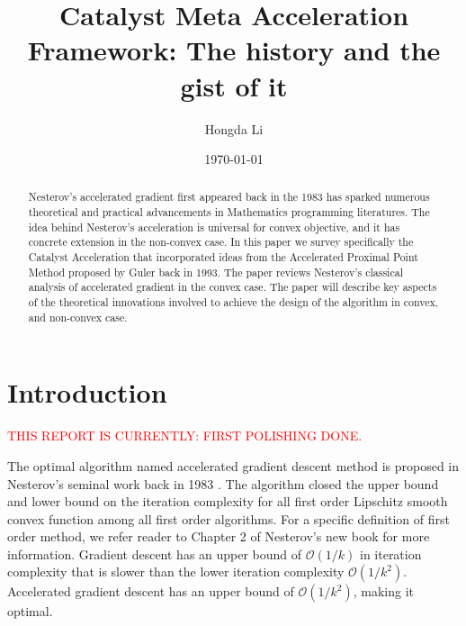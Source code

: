 \documentclass[12pt]{article}
\begin{document}
\title{
    {
        \selectfont 
        Catalyst Meta Acceleration Framework: The history and the gist of it
    }
    }

\author{
    Hongda Li
}

\date{\today}

\maketitle


\begin{abstract} 
    \noindent
    Nesterov's accelerated gradient first appeared back in the 1983 has sparked numerous theoretical and practical advancements in Mathematics programming literatures. 
    The idea behind Nesterov's acceleration is universal for convex objective, and it has concrete extension in the non-convex case. 
    In this paper we survey specifically the Catalyst Acceleration that incorporated ideas from the Accelerated Proximal Point Method proposed by Guler back in 1993. 
    The paper reviews Nesterov's classical analysis of accelerated gradient in the convex case.
    The paper will describe key aspects of the theoretical innovations involved to achieve the design of the algorithm in convex, and non-convex case. 
    
\end{abstract}


\section{Introduction}
    \textcolor{red}{THIS REPORT IS CURRENTLY: FIRST POLISHING DONE. }

    The optimal algorithm named accelerated gradient descent method is proposed in Nesterov's seminal work back in 1983 \cite{nesterov_method_1983}. 
    The algorithm closed the upper bound and lower bound on the iteration complexity for all first order Lipschitz smooth convex function among all first order algorithms. 
    For a specific definition of first order method, we refer reader to Chapter 2 of Nesterov's new book \cite{nesterov_lectures_2018} for more information. 
    Gradient descent has an upper bound of $\mathcal O(1/k)$ in iteration complexity that is slower than
    the lower iteration complexity $\mathcal O(1/k^2)$. 
    Accelerated gradient descent has an upper bound of $\mathcal O(1/k^2)$, making it optimal. 
\end{document}
